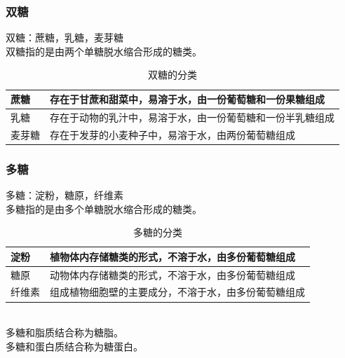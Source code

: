 \documentclass[UTF8]{ctexart}
\begin{document}
\subsubsection{双糖}
    双糖：蔗糖，乳糖，麦芽糖\\[2mm]
    双糖指的是由两个单糖脱水缩合形成的糖类。\vspace{10pt}
    \begin{table}[h]
        \begin{center}
            \begin{tabular}{l|l}
                \hline
                蔗糖\qquad\qquad&存在于甘蔗和甜菜中，易溶于水，由一份葡萄糖和一份果糖组成\qquad\qquad\\ \hline
                乳糖\qquad\qquad&存在于动物的乳汁中，易溶于水，由一份葡萄糖和一份半乳糖组成\qquad\qquad\\ \hline
                麦芽糖\qquad\qquad&存在于发芽的小麦种子中，易溶于水，由两份葡萄糖组成\\ \hline
            \end{tabular}
            \caption{双糖的分类}
        \end{center}
    \end{table}\vspace{-5pt}

\subsubsection{多糖}
    多糖：淀粉，糖原，纤维素\\[2mm]
    多糖指的是由多个单糖脱水缩合形成的糖类。\vspace{10pt}
    \begin{table}[h]
        \begin{center}
            \begin{tabular}{l|l}
                \hline
                淀粉\qquad\qquad&植物体内存储糖类的形式，不溶于水，由多份葡萄糖组成\qquad\qquad\\ \hline
                糖原\qquad\qquad&动物体内存储糖类的形式，不溶于水，由多份葡萄糖组成\qquad\qquad\\ \hline
                纤维素\qquad\qquad&组成植物细胞壁的主要成分，不溶于水，由多份葡萄糖组成\\ \hline
            \end{tabular}
            \caption{多糖的分类}
        \end{center}
    \end{table}\\
    多糖和脂质结合称为糖脂。\\[3mm]
    多糖和蛋白质结合称为糖蛋白。
\end{document}

